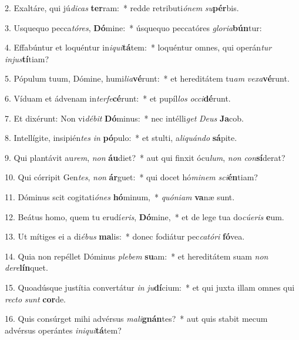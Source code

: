 2. Exaltáre, qui jú\textit{di}\textit{cas} \textbf{ter}ram:~*  redde retributi\textit{ó}\textit{nem} \textit{su}\textbf{pér}bis.\

3. Usquequo pecca\textit{tó}\textit{res}, \textbf{Dó}mine:~*  úsquequo peccatóres \textit{glo}\textit{ri}\textit{a}\textbf{bún}tur:\

4. Effabúntur et loquéntur in\textit{i}\textit{qui}\textbf{tá}tem:~*  loquéntur omnes, qui operán\textit{tur} \textit{in}\textit{jus}\textbf{tí}tiam?\

5. Pópulum tuum, Dómine, humi\textit{li}\textit{a}\textbf{vé}runt:~*  et hereditátem tu\textit{am} \textit{ve}\textit{xa}\textbf{vé}runt.\

6. Víduam et ádvenam in\textit{ter}\textit{fe}\textbf{cé}runt:~*  et pupíl\textit{los} \textit{oc}\textit{ci}\textbf{dé}runt.\

7. Et dixérunt: Non vi\textit{dé}\textit{bit} \textbf{Dó}minus:~*  nec intélli\textit{get} \textit{De}\textit{us} \textbf{Ja}cob.\

8. Intellígite, insipién\textit{tes} \textit{in} \textbf{pó}pulo:~*  et stulti, a\textit{li}\textit{quán}\textit{do} \textbf{sá}pite.\

9. Qui plantávit au\textit{rem}, \textit{non} \textbf{áu}diet?~*  aut qui finxit ócu\textit{lum}, \textit{non} \textit{con}\textbf{sí}derat?\

10. Qui córripit Gen\textit{tes}, \textit{non} \textbf{ár}guet:~*  qui docet hó\textit{mi}\textit{nem} \textit{sci}\textbf{én}tiam?\

11. Dóminus scit cogitati\textit{ó}\textit{nes} \textbf{hó}minum,~*  \textit{quón}\textit{i}\textit{am} \textbf{va}næ sunt.\

12. Beátus homo, quem tu erudí\textit{e}\textit{ris}, \textbf{Dó}mine,~*  et de lege tua do\textit{cú}\textit{e}\textit{ris} \textbf{e}um.\

13. Ut mítiges ei a di\textit{é}\textit{bus} \textbf{ma}lis:~*  donec fodiátur pec\textit{ca}\textit{tó}\textit{ri} \textbf{fó}vea.\

14. Quia non repéllet Dóminus \textit{ple}\textit{bem} \textbf{su}am:~*  et hereditátem suam \textit{non} \textit{de}\textit{re}\textbf{lín}quet.\

15. Quoadúsque justítia convertátur \textit{in} \textit{ju}\textbf{dí}cium:~*  et qui juxta illam omnes qui \textit{rec}\textit{to} \textit{sunt} \textbf{cor}de.\

16. Quis consúrget mihi advérsus \textit{ma}\textit{li}\textbf{gnán}tes?~*  aut quis stabit mecum advérsus operántes \textit{in}\textit{i}\textit{qui}\textbf{tá}tem?\

